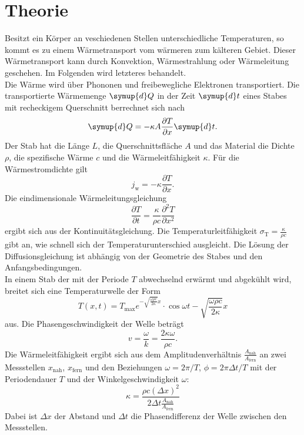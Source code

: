\section{Theorie}
\label{sec:Theorie}
Besitzt ein Körper an veschiedenen Stellen unterschiedliche Temperaturen, so kommt es zu einem Wärmetransport vom wärmeren zum kälteren Gebiet.
Dieser Wärmetransport kann durch Konvektion, Wärmestrahlung oder Wärmeleitung geschehen.
Im Folgenden wird letzteres behandelt.\\
Die Wärme wird über Phononen und freibewegliche Elektronen transportiert.
Die transportierte Wärmemenge $\symup{d}Q$ in der Zeit $\symup{d}t$ eines Stabes mit recheckigem Querschnitt berrechnet sich nach
\begin{equation}
    \symup{d}Q = -\kappa A \frac{\partial T}{\partial x} \symup{d}t .
    \label{eqn:leit}
\end{equation}
Der Stab hat die Länge $L$, die Querschnittsfläche $A$ und das Material die Dichte $\rho$, die spezifische Wärme $c$ und die Wärmeleitfähigkeit $\kappa$.
Für die Wärmestromdichte gilt 
\begin{equation*}
    j_\text{w} = -\kappa \frac{\partial T}{\partial x} .
\end{equation*}
Die eindimensionale Wärmeleitungsgleichung
\begin{equation*}
    \frac{\partial T}{\partial t} = \frac{\kappa}{\rho c} \frac{\partial^2 T}{\partial x^2}
    \label{eqn:wellengleichung}
\end{equation*}
ergibt sich aus der Kontinuitätsgleichung.
Die Temperaturleitfähigkeit $\sigma_\text{T} = \frac{\kappa}{\rho c}$ gibt an, wie schnell sich der Temperaturunterschied ausgleicht.
Die Lösung der Diffusionsgleichung ist abhängig von der Geometrie des Stabes und den Anfangsbedingungen.
\\
In einem Stab der mit der Periode $T$ abwechselnd erwärmt und abgekühlt wird, breitet sich eine Temperaturwelle der Form
\begin{equation*}
    T(x,t) = T_\text{max} e^{-\sqrt{\frac{\omega \rho c}{2 \kappa}}x} \cdot \cos{\omega t - \sqrt{\frac{\omega \rho c}{2 \kappa}}x}
\end{equation*}
aus.
Die Phasengeschwindigkeit der Welle beträgt
\begin{equation*}
    v = \frac{\omega}{k} = \frac{2 \kappa \omega}{\rho c} .
\end{equation*}
Die Wärmeleitfähigkeit ergibt sich aus dem Amplitudenverhältnis $\frac{A_\text{nah}}{A_\text{fern}}$ an zwei Messstellen $x_\text{nah}$, $x_\text{fern}$ und den Beziehungen $\omega = 2\pi / T$, $\phi = 2 \pi \Delta t / T$ mit der Periodendauer $T$ und der Winkelgeschwindigkeit $\omega$:
\begin{equation}
    \kappa = \frac{\rho c (\Delta x)^2}{2 \Delta t \frac{A_\text{nah}}{A_\text{fern}}}
    \label{eqn:kappa}
\end{equation}
Dabei ist $\Delta x$ der Abstand und $\Delta t$ die Phasendifferenz der Welle zwischen den Messstellen.